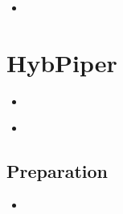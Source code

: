\documentclass[compress, ucs, xelatex, 11pt, xcolor=x11names, aspectratio=1609,
	hyperref={
		bookmarks=true,
		unicode=true,
		colorlinks=true,
		pdftitle={HybSeq course},
		plainpages=false,
		pdfauthor={Vojtech Zeisek},
		pdfsubject={Practical processing of HybSeq target enrichment sequencing data on computing grids like MetaCentrum},
		pdfcreator={XeLaTeX},
		pdfkeywords={BASH, command line, GNU, HybSeq, Linux, MetaCentrum, sequencing shell, target enrichment},
		linkcolor=Cyan2, %
		anchorcolor=Firebrick2, %
		citecolor=Firebrick2, %
		filecolor=Firebrick2, %
		menucolor=Firebrick2, %
		urlcolor=Chartreuse2, %
		pdftex},
	url={hyphens, lowtilde} %
	]{beamer}
\begin{document}
\begin{frame}[fragile]{}
	\begin{itemize}
		\item 
	\end{itemize}
	\begin{spluscode}
    
	\end{spluscode}
	\begin{bashcode}
    
	\end{bashcode}
\end{frame}

\section{HybPiper}

\begin{frame}[fragile]{}
	\begin{itemize}
		\item 
	\end{itemize}
	\begin{spluscode}
    
	\end{spluscode}
	\begin{bashcode}
    
	\end{bashcode}
\end{frame}

\begin{frame}[fragile]{}
	\begin{itemize}
		\item 
	\end{itemize}
	\begin{spluscode}
    
	\end{spluscode}
	\begin{bashcode}
    
	\end{bashcode}
\end{frame}

\subsection{Preparation}

\begin{frame}[fragile]{}
	\begin{itemize}
		\item 
	\end{itemize}
	\begin{spluscode}
    
	\end{spluscode}
	\begin{bashcode}
    
	\end{bashcode}
\end{frame}
\end{document}
